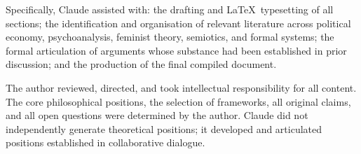 Specifically, Claude assisted with: the drafting and \LaTeX\ typesetting of all sections; the identification and organisation of relevant literature across political economy, psychoanalysis, feminist theory, semiotics, and formal systems; the formal articulation of arguments whose substance had been established in prior discussion; and the production of the final compiled document.

The author reviewed, directed, and took intellectual responsibility for all content. The core philosophical positions, the selection of frameworks, all original claims, and all open questions were determined by the author. Claude did not independently generate theoretical positions; it developed and articulated positions established in collaborative dialogue.

\vspace{1.0em}

\goldrule
